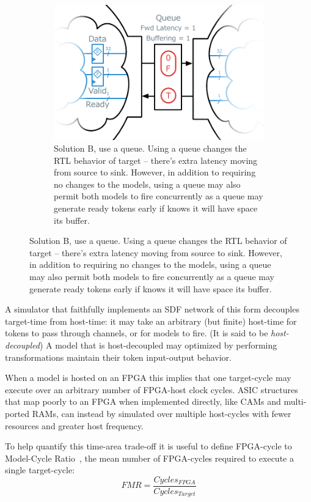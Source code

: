 \begin{figure}
    \begin{subfigure}[t]{0.48\textwidth}
        \includegraphics[width=\textwidth]{figures/queue-decoupled-example.pdf}
        \caption{Solution B, use a queue. Using a queue changes the RTL
        behavior of target -- there's extra latency moving from source to sink.
        However, in addition to requiring no changes to the models, using a queue may also
        permit both models to fire concurrently as a queue may generate
        ready tokens early if knows it will have space its buffer.}
        \label{fig:queue-decoupled-example}
    \end{subfigure}
\end{figure}

A simulator that faithfully implements an SDF network of this form decouples
target-time from host-time: it may take an arbitrary (but finite) host-time for
tokens to pass through channels, or for models to fire. (It is said to be
\emph{host-decoupled}) A model that is host-decoupled may optimized by
performing transformations maintain their token input-output behavior.

When a model is hosted on an FPGA this implies that one target-cycle may
execute over an arbitrary number of FPGA-host clock cycles.  ASIC structures
that map poorly to an FPGA when implemented directly, like CAMs and
multi-ported RAMs, can instead by simulated over multiple host-cycles with
fewer resources and greater host frequency.

To help quantify this time-area trade-off it is useful to define FPGA-cycle to
Model-Cycle Ratio~\cite{APorts}, the mean number of FPGA-cycles required to
execute a single target-cycle: $$ FMR = \frac{Cycles_{FPGA}}{Cycles_{Target}}
$$

